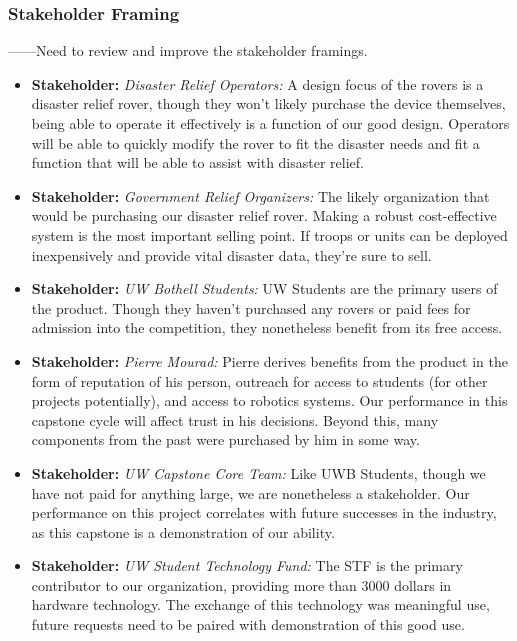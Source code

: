 \documentclass[a4paper, 10pt]{article}
\begin{document}
		\subsubsection{Stakeholder Framing}
		------Need to review and improve the stakeholder framings.			
			\begin{itemize}
			\item
			\textbf{Stakeholder:} \emph{Disaster Relief Operators:} A design focus of the rovers is a disaster relief rover, though they won't likely purchase the device themselves, being able to operate it effectively is a function of our good design. Operators will be able to quickly modify the rover to fit the disaster needs and fit a function that will be able to assist with disaster relief. 
			
			\item
\textbf{Stakeholder:} \emph{Government Relief Organizers:} The likely organization that would be purchasing our disaster relief rover. Making a robust cost-effective system is the most important selling point. If troops or units can be deployed inexpensively and provide vital disaster data, they're sure to sell. 

			\item
\textbf{Stakeholder:} \emph{UW Bothell Students:} UW Students are the primary users of the product. Though they haven't purchased any rovers or paid fees for admission into the competition, they nonetheless benefit from its free access.

			\item
\textbf{Stakeholder:} \emph{Pierre Mourad:} Pierre derives benefits from the product in the form of reputation of his person, outreach for access to students (for other projects potentially), and access to robotics systems. Our performance in this capstone cycle will affect trust in his decisions. Beyond this, many components from the past were purchased by him in some way.

			\item
\textbf{Stakeholder:} \emph{UW Capstone Core Team:} Like UWB Students, though we have not paid for anything large, we are nonetheless a stakeholder. Our performance on this project correlates with future successes in the industry, as this capstone is a demonstration of our ability.

			\item
\textbf{Stakeholder:} \emph{UW Student Technology Fund:} The STF is the primary contributor to our organization, providing more than 3000 dollars in hardware technology. The exchange of this technology was meaningful use, future requests need to be paired with demonstration of this good use.
			\end{itemize}
			
\end{document}
